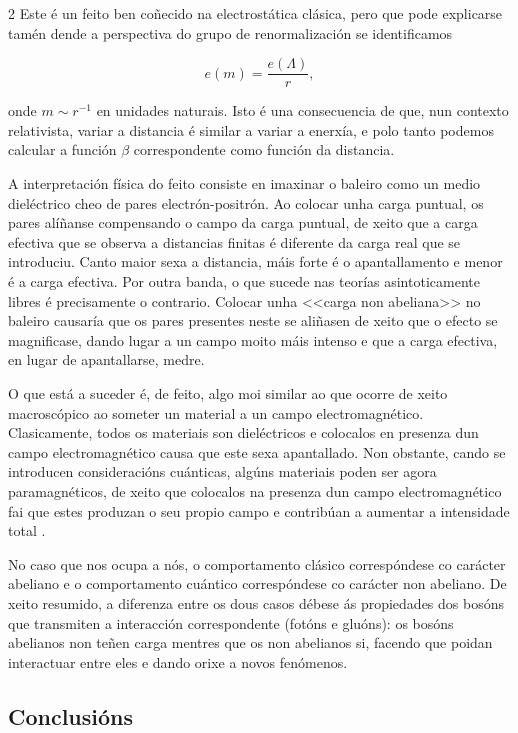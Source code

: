 \begin{multicols}{2}
\noindent Este é un feito ben coñecido na electrostática clásica, pero que pode
explicarse tamén dende a perspectiva do grupo de renormalización se
identificamos

\begin{equation}
    e(m) = \frac{e(\Lambda)}{r},
\end{equation}

\noindent onde $m \sim r^{-1}$ en unidades naturais. Isto é una consecuencia de
que, nun contexto relativista, variar a distancia é similar a variar a enerxía,
e polo tanto podemos calcular a función $\beta$ correspondente como función da
distancia.

A interpretación física do feito consiste en imaxinar o baleiro como un medio
dieléctrico cheo de pares electrón-positrón. Ao colocar unha carga puntual, os
pares alíñanse compensando o campo da carga puntual, de xeito que a carga
efectiva que se observa a distancias finitas é diferente da carga real que se
introduciu. Canto maior sexa a distancia, máis forte é o apantallamento e menor
é a carga efectiva. Por outra banda, o que sucede nas teorías asintoticamente
libres é precisamente o contrario. Colocar unha <<carga non
abeliana>> no baleiro causaría que os pares presentes neste se
aliñasen de xeito que o efecto se magnificase, dando lugar a un campo moito
máis intenso e que a carga efectiva, en lugar de apantallarse, medre.

O que está a suceder é, de feito, algo moi similar ao que ocorre de xeito
macroscópico ao someter un material a un campo electromagnético. Clasicamente,
todos os materiais son dieléctricos e colocalos en presenza dun campo
electromagnético causa que este sexa apantallado. Non obstante, cando se
introducen consideracións cuánticas, algúns materiais poden ser agora
paramagnéticos, de xeito que colocalos na presenza dun campo electromagnético
fai que estes produzan o seu propio campo e contribúan a aumentar a intensidade
total \cite{Momentum}.

No caso que nos ocupa a nós, o comportamento clásico correspóndese co carácter
abeliano e o comportamento cuántico correspóndese co carácter non abeliano. De
xeito resumido, a diferenza entre os dous casos débese ás propiedades dos
bosóns que transmiten a interacción correspondente (fotóns e gluóns): os bosóns
abelianos non teñen carga mentres que os non abelianos si, facendo que poidan
interactuar entre eles e dando orixe a novos fenómenos.

\subsection*{Conclusións}


\end{multicols}

